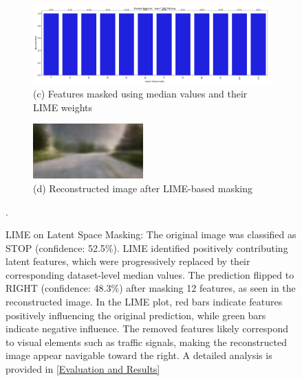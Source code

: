 \begin{figure}[htbp]
\begin{subfigure}{0.72\textwidth}
    \end{subfigure}
    \vspace{0.5em}
    \begin{subfigure}{0.72\textwidth}
        \includegraphics[width=\linewidth]{img/masking/lime_on_latent/town7_002748.png_masked_features.png}
        \caption*{(c) Features masked using median values and their LIME weights}
    \end{subfigure}
    \hfill
    \begin{subfigure}{0.24\textwidth}
        \includegraphics[width=\linewidth]{img/masking/lime_on_latent/reconstructed_lime_on_features.png}
        \caption*{(d) Reconstructed image after LIME-based masking}
    \end{subfigure}

    \caption{LIME on Latent Space Masking: The original image was classified as STOP (confidence: 52.5\%). LIME identified positively contributing latent features, which were progressively replaced by their corresponding dataset-level median values. The prediction flipped to RIGHT (confidence: 48.3\%) after masking 12 features, as seen in the reconstructed image. In the LIME plot, red bars indicate features positively influencing the original prediction, while green bars indicate negative influence. The removed features likely correspond to visual elements such as traffic signals, making the reconstructed image appear navigable toward the right. A detailed analysis is provided in \cref{Evaluation and Results}}.


\end{figure}

